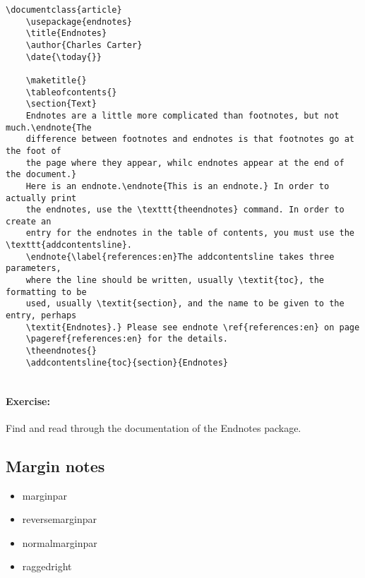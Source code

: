         \begin{verbatim}
\documentclass{article}
    \usepackage{endnotes}
    \title{Endnotes}
    \author{Charles Carter}
    \date{\today{}}
 
    \maketitle{}
    \tableofcontents{}
    \section{Text}
    Endnotes are a little more complicated than footnotes, but not much.\endnote{The 
    difference between footnotes and endnotes is that footnotes go at the foot of 
    the page where they appear, whilc endnotes appear at the end of the document.} 
    Here is an endnote.\endnote{This is an endnote.} In order to actually print 
    the endnotes, use the \texttt{theendnotes} command. In order to create an 
    entry for the endnotes in the table of contents, you must use the \texttt{addcontentsline}.
    \endnote{\label{references:en}The addcontentsline takes three parameters, 
    where the line should be written, usually \textit{toc}, the formatting to be 
    used, usually \textit{section}, and the name to be given to the entry, perhaps 
    \textit{Endnotes}.} Please see endnote \ref{references:en} on page 
    \pageref{references:en} for the details.
    \theendnotes{}
    \addcontentsline{toc}{section}{Endnotes}
    
        \end{verbatim}

        \paragraph{Exercise:} Find and read through the documentation of the Endnotes package.

    \subsection{Margin notes}
    \label{Margin notes}

        \begin{framed}
            \begin{itemize}
                \item{marginpar}
                \item{reversemarginpar}
                \item{normalmarginpar}
                \item{raggedright}
            \end{itemize}
        \end{framed}

